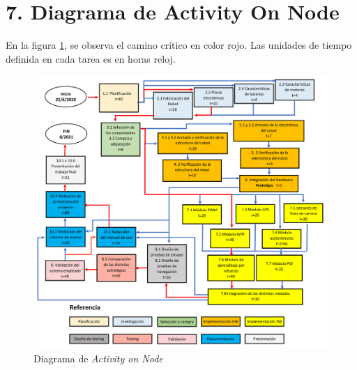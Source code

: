 \documentclass[11pt]{charter}
\begin{document}
\vspace{80mm}

\section{7. Diagrama de Activity On Node}
\label{sec:AoN}
En la figura \ref{fig:AoN}, se observa el camino crítico en color rojo. Las unidades de tiempo definida en cada tarea es en horas reloj. 
\begin{figure}[htpb]
\centering 
\includegraphics[width=.8\textwidth]{./Figuras/AoN.png}
\caption{Diagrama de \textit{Activity on Node}}
\label{fig:AoN}
\end{figure}

\vspace{80mm}
\end{document}
